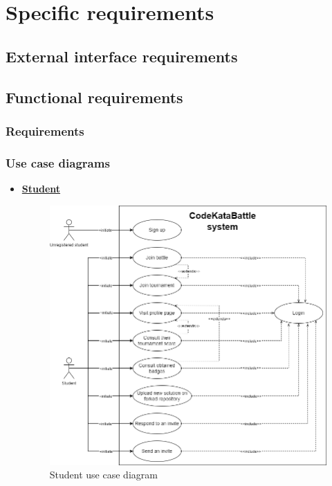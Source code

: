 \documentclass{article}
\begin{document}
{\section{Specific requirements}
\subsection{External interface requirements}
\subsection{Functional requirements}
    \subsubsection{Requirements}
        \subsubsection{Use case diagrams}
            \begin{itemize}
                \item \underline{\large{\textbf{Student}}}
                    \begin{figure}[H]
                        \centering
                        \includegraphics[scale=0.4]{images/3.2.2_UseCaseDiagrams/CaseDiagramStudent.png}
                        \caption{Student use case diagram}
                        \label{fig:studentUseCaseDiagram}
                    \end{figure}
                    

\end{itemize}}
\end{document}
